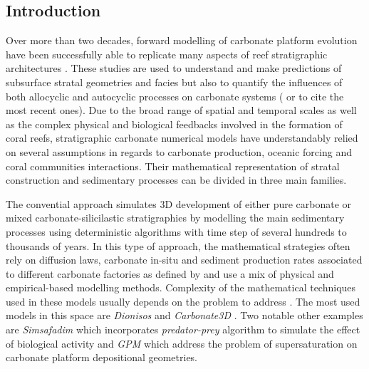 \documentclass[default,jgrga]{agutex2015}
\begin{document}
\begin{article}

%
%

\section{Introduction}

Over more than two decades, forward modelling of carbonate platform evolution have been successfully able to replicate many aspects of reef stratigraphic architectures \citep{Bosence90, Parcell03, Hasler08, Barrett12, Seard13, Huang15, Kolodka16}. These studies are used to understand and make predictions of subsurface stratal geometries and facies but also to quantify the influences of both allocyclic and autocyclic processes on carbonate systems (\citet{Williams11} or \citet{Burgess13} to cite the most recent ones). Due to the broad range of spatial and temporal scales as well as the complex physical and biological feedbacks involved in the formation of coral reefs, stratigraphic carbonate numerical models have understandably relied on several assumptions in regards to carbonate production, oceanic forcing and coral communities interactions. Their mathematical representation of stratal construction and sedimentary processes can be divided in three main families.

\noindent The convential approach simulates 3D development of either pure carbonate or mixed carbonate-silicilastic stratigraphies by modelling the main sedimentary processes using deterministic algorithms with time step of several hundreds to thousands of years. In this type of approach, the mathematical strategies often rely on diffusion laws, carbonate in-situ and sediment production rates associated to different carbonate factories as defined by \citet{James92} and use a mix of physical and empirical-based modelling methods. Complexity of the mathematical techniques used in these models usually depends on the problem to address \citep{Granjeon99, Warrlich02, Toomey16}. The most used models in this space are \textit{Dionisos} \citep{Granjeon99} and \textit{Carbonate3D} \citep{Warrlich02}. Two notable other examples are \textit{Simsafadim} \citep{Bitzer01} which incorporates \textit{predator-prey} algorithm to simulate the effect of biological activity and \textit{GPM} \citep{Tetzlaff05, Hill06} which address the problem of supersaturation on carbonate platform depositional geometries.


\end{article}
\end{document}
